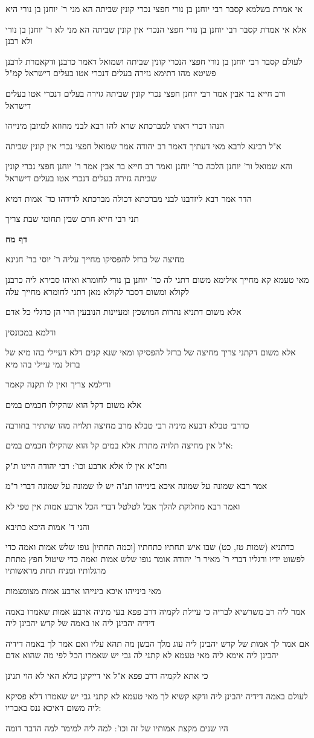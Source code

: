 \documentclass[12pt, openany]{book}
\newcommand{\sethebfont}{
\fontsize{10.5pt}{21.0pt} \selectfont
}
\newcommand{\textblock}[1]{
{\sethebfont #1\\}	
}
\newcommand{\sectname}{}
\newcommand{\newsection}[1]{
	\addcontentsline{toc}{section}{#1}
	\renewcommand{\sectname}{#1}	
	\vspace{-\baselineskip}
	\begin{center}
		\textbf{%
\fontsize{16pt}{16pt}\selectfont
			#1}
	\end{center}
	\vspace{-\baselineskip}
	\nopagebreak
}
\begin{document}
\textblock{אי אמרת בשלמא קסבר רבי יוחנן בן נורי חפצי נכרי קונין שביתה הא מני ר' יוחנן בן נורי היא}
\textblock{אלא אי אמרת קסבר רבי יוחנן בן נורי חפצי הנכרי אין קונין שביתה הא מני לא ר' יוחנן בן נורי ולא רבנן}
\textblock{לעולם קסבר רבי יוחנן בן נורי חפצי הנכרי קונין שביתה ושמואל דאמר כרבנן ודקאמרת לרבנן פשיטא מהו דתימא גזירה בעלים דנכרי אטו בעלים דישראל קמ"ל}
\textblock{ורב חייא בר אבין אמר רבי יוחנן חפצי נכרי קונין שביתה גזירה בעלים דנכרי אטו בעלים דישראל}
\textblock{הנהו דכרי דאתו למברכתא שרא להו רבא לבני מחוזא למיזבן מינייהו}
\textblock{א"ל רבינא לרבא מאי דעתיך דאמר רב יהודה אמר שמואל חפצי נכרי אין קונין שביתה}
\textblock{והא שמואל ור' יוחנן הלכה כר' יוחנן ואמר רב חייא בר אבין אמר ר' יוחנן חפצי נכרי קונין שביתה גזירה בעלים דנכרי אטו בעלים דישראל}
\textblock{הדר אמר רבא ליזדבנו לבני מברכתא דכולה מברכתא לדידהו כד' אמות דמיא}
\textblock{תני רבי חייא חרם שבין תחומי שבת צריך}
\newsection{דף מח}
\textblock{מחיצה של ברזל להפסיקו מחייך עליה ר' יוסי בר' חנינא}
\textblock{מאי טעמא קא מחייך אילימא משום דתני לה כר' יוחנן בן נורי לחומרא ואיהו סבירא ליה כרבנן לקולא ומשום דסבר לקולא מאן דתני לחומרא מחייך עלה}
\textblock{אלא משום דתניא נהרות המושכין ומעיינות הנובעין הרי הן כרגלי כל אדם}
\textblock{ודלמא במכונסין}
\textblock{אלא משום דקתני צריך מחיצה של ברזל להפסיקו ומאי שנא קנים דלא דעיילי בהו מיא של ברזל נמי עיילי בהו מיא}
\textblock{ודילמא צריך ואין לו תקנה קאמר}
\textblock{אלא משום דקל הוא שהקילו חכמים במים}
\textblock{כדרבי טבלא דבעא מיניה רבי טבלא מרב מחיצה תלויה מהו שתתיר בחורבה}
\textblock{א"ל אין מחיצה תלויה מתרת אלא במים קל הוא שהקילו חכמים במים:}
\textblock{וחכ"א אין לו אלא ארבע וכו': רבי יהודה היינו ת"ק}
\textblock{אמר רבא שמונה על שמונה איכא בינייהו תנ"ה יש לו שמונה על שמונה דברי ר"מ}
\textblock{ואמר רבא מחלוקת להלך אבל לטלטל דברי הכל ארבע אמות אין טפי לא}
\textblock{והני ד' אמות היכא כתיבא}
\textblock{כדתניא (שמות טז, כט) שבו איש תחתיו כתחתיו [וכמה תחתיו] גופו שלש אמות ואמה כדי לפשוט ידיו ורגליו דברי ר' מאיר ר' יהודה אומר גופו שלש אמות ואמה כדי שיטול חפץ מתחת מרגלותיו ומניח תחת מראשותיו}
\textblock{מאי בינייהו איכא בינייהו ארבע אמות מצומצמות}
\textblock{אמר ליה רב משרשיא לבריה כי עיילת לקמיה דרב פפא בעי מיניה ארבע אמות שאמרו באמה דידיה יהבינן ליה או באמה של קדש יהבינן ליה}
\textblock{אם אמר לך אמות של קדש יהבינן ליה עוג מלך הבשן מה תהא עליו ואם אמר לך באמה דידיה יהבינן ליה אימא ליה מאי טעמא לא קתני לה גבי יש שאמרו הכל לפי מה שהוא אדם}
\textblock{כי אתא לקמיה דרב פפא א"ל אי דייקינן כולא האי לא הוי תנינן}
\textblock{לעולם באמה דידיה יהבינן ליה ודקא קשיא לך מאי טעמא לא קתני גבי יש שאמרו דלא פסיקא ליה משום דאיכא ננס באבריו:}
\textblock{היו שנים מקצת אמותיו של זה וכו': למה ליה למימר למה הדבר דומה}
\end{document}
